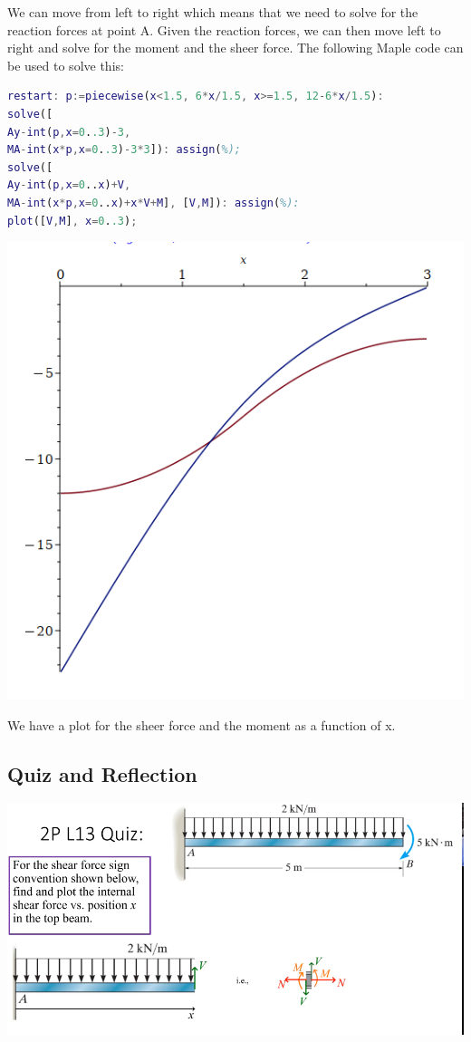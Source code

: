 \documentclass{article}[14pt, letterpaper, Times New Roman]
\begin{document}
We can move from left to right which means that we need to solve for the reaction forces at point A.
Given the reaction forces, we can then move left to right and solve for the moment and the sheer force.
The following Maple code can be used to solve this:

\begin{lstlisting}[language=matlab]
restart: p:=piecewise(x<1.5, 6*x/1.5, x>=1.5, 12-6*x/1.5):
solve([
Ay-int(p,x=0..3)-3,
MA-int(x*p,x=0..3)-3*3]): assign(%);
solve([
Ay-int(p,x=0..x)+V,
MA-int(x*p,x=0..x)+x*V+M], [V,M]): assign(%):
plot([V,M], x=0..3);
\end{lstlisting}

\includegraphics[width=15cm]{l13-lq-o.png}

We have a plot for the sheer force and the moment as a function of x.

\subsection{Quiz and Reflection}

\includegraphics[width=15cm]{l13-quiz.png}
\end{document}
